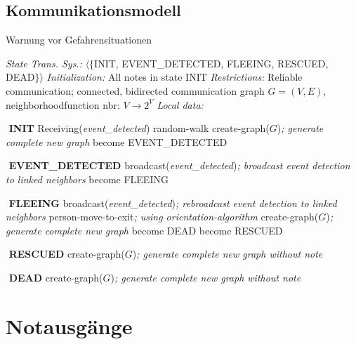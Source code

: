 \subsection{Kommunikationsmodell}
\label{sec:kommunikationsmodell}

\begin{algorithm}
\caption{Warnung vor Gefahrensituationen}
\begin{algorithmic} 
\STATE \textit{State Trans. Sys.:} $\langle\{$INIT, EVENT{\_}DETECTED, FLEEING, RESCUED, DEAD$\}\rangle$
\STATE \textit{Initialization:} All notes in state INIT
\STATE \textit{Restrictions:} Reliable communication; connected, bidirected communication graph $G = (V,E)$, neighborhoodfunction nbr: $V \rightarrow 2^{V}$
\STATE \textit{Local data:}

\STATE $ $
\STATE \textbf{INIT}
\STATE Receiving(\textit{event{\_}detected})
\STATE random-walk
\STATE create-graph($G$)\hfill\emph{; generate complete new graph}
\ENDWHILE
\STATE become EVENT{\_}DETECTED


\STATE $ $
\STATE \textbf{EVENT{\_}DETECTED}
\STATE broadcast(\textit{event{\_}detected})\hfill\emph{; broadcast event detection to linked neighbors}
\STATE become FLEEING

\STATE $ $
\STATE \textbf{FLEEING}
\STATE broadcast(\textit{event{\_}detected})\hfill\emph{; rebroadcast event detection to linked neighbors}
\STATE person-move-to-exit\hfill\emph{; using orientation-algorithm}
\STATE create-graph($G$)\hfill\emph{; generate complete new graph}
\STATE become DEAD
\ENDIF
\ENDWHILE
\STATE become RESCUED

\STATE $ $
\STATE \textbf{RESCUED}
\STATE create-graph($G$)\hfill\emph{; generate complete new graph without note}

\STATE $ $
\STATE \textbf{DEAD}
\STATE create-graph($G$)\hfill\emph{; generate complete new graph without note}

\end{algorithmic}
\end{algorithm}

\section{Notausgänge}
\label{sec:notausgaenge}

